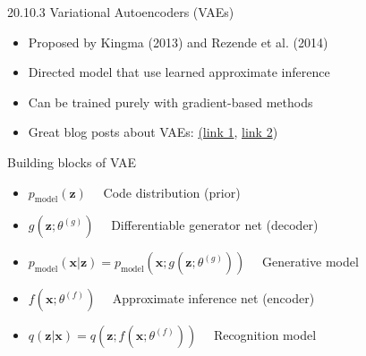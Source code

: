 \documentclass[dvipdfmx,presentation]{beamer}
\def\bf{\mathbf}
\begin{document}
\begin{frame}[label={sec:orgheadline20}]{20.10.3 Variational Autoencoders (VAEs)}
\begin{itemize}
\item Proposed by Kingma (2013) and Rezende et al. (2014)
\item Directed model that use learned approximate inference
\item Can be trained purely with gradient-based methods
\item Great blog posts about VAEs: \href{http://blog.fastforwardlabs.com/post/148842796218/introducing-variational-autoencoders-in-prose-and}{(link 1}, \href{http://blog.fastforwardlabs.com/post/149329060653/under-the-hood-of-the-variational-autoencoder-in}{link 2})
\end{itemize}
\begin{block}{Building blocks of VAE}
\begin{itemize}
\item \(p_{\mathrm{model}}(\bf{z})\quad\) Code distribution (prior)
\item \(g(\bf{z}; \theta^{(g)})\quad\) Differentiable generator net (decoder)
\item \(p_{\mathrm{model}}(\bf{x} | \bf{z}) = p_{\mathrm{model}}(\bf{x}; g(\bf{z}; \theta^{(g)}))\quad\) Generative model
\item \(f(\bf{x}; \theta^{(f)})\quad\) Approximate inference net (encoder)
\item \(q(\bf{z} | \bf{x}) = q(\bf{z}; f(\bf{x}; \theta^{(f)}))\quad\) Recognition model
\end{itemize}
\end{block}
\end{frame}
\end{document}
